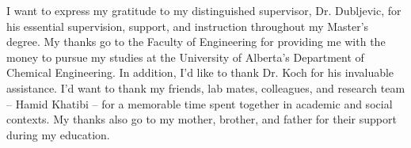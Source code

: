 





\begin{acknowledgements}
I want to express my gratitude to my distinguished supervisor, Dr. Dubljevic, for his essential supervision, support, and instruction throughout my Master's degree. My thanks go to the Faculty of Engineering for providing me with the money to pursue my studies at the University of Alberta's Department of Chemical Engineering. In addition, I'd like to thank Dr. Koch for his invaluable assistance. I'd want to thank my friends, lab mates, colleagues, and research team – Hamid Khatibi – for a memorable time spent together in academic and social contexts. My thanks also go to my mother, brother, and father for their support during my education.

\end{acknowledgements}





